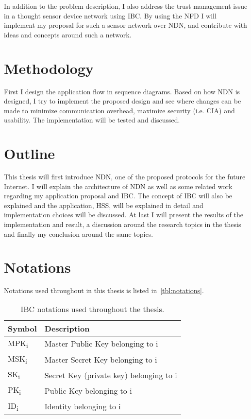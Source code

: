 In addition to the problem description, I also address the trust management issue in a thought sensor device network using \gls{IBC}.
By using the \gls{NFD} I will implement my proposal for such a sensor network over \gls{NDN}, and contribute with ideas and concepts around such a network.

\section{Methodology}

First I design the application flow in sequence diagrams.
Based on how \gls{NDN} is designed, I try to implement the proposed design and see where changes can be made to minimize communication overhead, maximize security (i.e. \gls{CIA}) and usability.
The implementation will be tested and discussed.

\section{Outline}

This thesis will first introduce \gls{NDN}, one of the proposed protocols for the future Internet.
I will explain the architecture of \gls{NDN} as well as some related work regarding my application proposal and \gls{IBC}. 
The concept of \gls{IBC} will also be explained and the application, \gls{HSS}, will be explained in detail and implementation choices will be discussed.
At last I will present the results of the implementation and result, a discussion around the research topics in the thesis and finally my conclusion around the same topics.

\section{Notations}
Notations used throughout in this thesis is listed in~\autoref{tbl:notations}.
\begin{table}[h]
  \begin{tabular}[c]{p{}p{}}
  \hline
  Symbol                    & Description                               \\ \hline
  MPK\textsubscript{i}      & Master Public Key belonging to i          \\ %
  MSK\textsubscript{i}      & Master Secret Key belonging to i          \\ %
  SK\textsubscript{i}       & Secret Key (private key) belonging to i   \\ %
  PK\textsubscript{i}       & Public Key belonging to i                 \\ %
  ID\textsubscript{i}       & Identity belonging to i                   \\ %
  \end{tabular}
  \caption[IBC Notations]{IBC notations used throughout the thesis.}
  \label{tbl:notations}
\end{table}